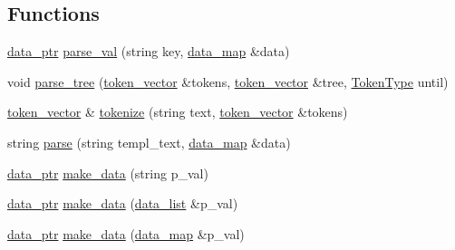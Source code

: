 \subsection*{Functions}
\begin{DoxyCompactItemize}
\item 
\hyperlink{namespacextd_1_1network_1_1http_1_1cpptempl_ad2f49991f1902699a98cf62bf0ae7ce6}{data\+\_\+ptr} \hyperlink{namespacextd_1_1network_1_1http_1_1cpptempl_af79d10d06cd5bc9ce629bb2d21fbcfd6}{parse\+\_\+val} (string key, \hyperlink{namespacextd_1_1network_1_1http_1_1cpptempl_a638d1d81c8fb63c0bbafd508d6a2a007}{data\+\_\+map} \&data)
\item 
void \hyperlink{namespacextd_1_1network_1_1http_1_1cpptempl_a27515db5dde2876849fa316963a67e63}{parse\+\_\+tree} (\hyperlink{namespacextd_1_1network_1_1http_1_1cpptempl_a38606cfbbfe81ed46ea9b0cf064de956}{token\+\_\+vector} \&tokens, \hyperlink{namespacextd_1_1network_1_1http_1_1cpptempl_a38606cfbbfe81ed46ea9b0cf064de956}{token\+\_\+vector} \&tree, \hyperlink{namespacextd_1_1network_1_1http_1_1cpptempl_a39833083d228a5b5ef9f6bb7896479ee}{Token\+Type} until)
\item 
\hyperlink{namespacextd_1_1network_1_1http_1_1cpptempl_a38606cfbbfe81ed46ea9b0cf064de956}{token\+\_\+vector} \& \hyperlink{namespacextd_1_1network_1_1http_1_1cpptempl_ab8c502f7e8347124c43f3dab3a583b34}{tokenize} (string text, \hyperlink{namespacextd_1_1network_1_1http_1_1cpptempl_a38606cfbbfe81ed46ea9b0cf064de956}{token\+\_\+vector} \&tokens)
\item 
string \hyperlink{namespacextd_1_1network_1_1http_1_1cpptempl_a10e259ee95bf5effff9095cdd140a058}{parse} (string templ\+\_\+text, \hyperlink{namespacextd_1_1network_1_1http_1_1cpptempl_a638d1d81c8fb63c0bbafd508d6a2a007}{data\+\_\+map} \&data)
\item 
\hyperlink{namespacextd_1_1network_1_1http_1_1cpptempl_ad2f49991f1902699a98cf62bf0ae7ce6}{data\+\_\+ptr} \hyperlink{namespacextd_1_1network_1_1http_1_1cpptempl_a32fe5ec0914372b09492647a168dbbcb}{make\+\_\+data} (string p\+\_\+val)
\item 
\hyperlink{namespacextd_1_1network_1_1http_1_1cpptempl_ad2f49991f1902699a98cf62bf0ae7ce6}{data\+\_\+ptr} \hyperlink{namespacextd_1_1network_1_1http_1_1cpptempl_aae0780ff5e5b2afd5996fb6d27ff8ca0}{make\+\_\+data} (\hyperlink{namespacextd_1_1network_1_1http_1_1cpptempl_aff1b51bcf8064f69c85dd4833c1853b4}{data\+\_\+list} \&p\+\_\+val)
\item 
\hyperlink{namespacextd_1_1network_1_1http_1_1cpptempl_ad2f49991f1902699a98cf62bf0ae7ce6}{data\+\_\+ptr} \hyperlink{namespacextd_1_1network_1_1http_1_1cpptempl_a4574c7173346efa3cfa420e5c657b58d}{make\+\_\+data} (\hyperlink{namespacextd_1_1network_1_1http_1_1cpptempl_a638d1d81c8fb63c0bbafd508d6a2a007}{data\+\_\+map} \&p\+\_\+val)

\end{DoxyCompactItemize}
